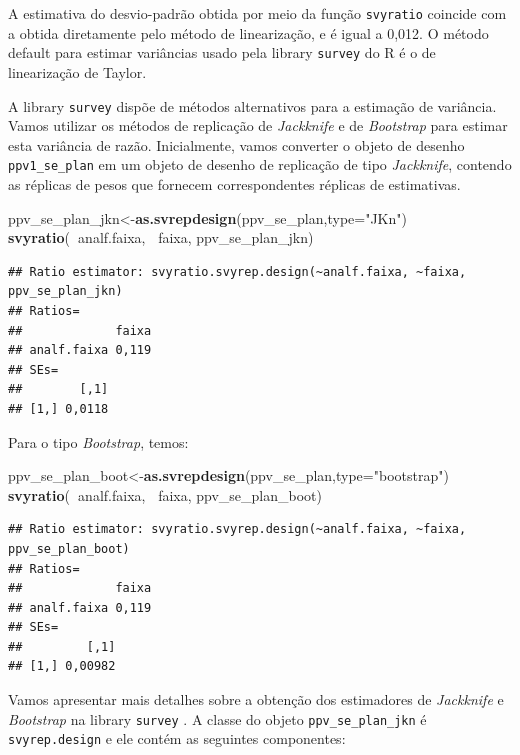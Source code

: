 \documentclass[]{book}
\newenvironment{Shaded}{\begin{snugshade}}{\end{snugshade}}
\newcommand{\KeywordTok}[1]{\textcolor[rgb]{0.13,0.29,0.53}{\textbf{#1}}}
\newcommand{\DataTypeTok}[1]{\textcolor[rgb]{0.13,0.29,0.53}{#1}}
\newcommand{\StringTok}[1]{\textcolor[rgb]{0.31,0.60,0.02}{#1}}
\newcommand{\OperatorTok}[1]{\textcolor[rgb]{0.81,0.36,0.00}{\textbf{#1}}}
\newcommand{\NormalTok}[1]{#1}
\theoremstyle{definition}
\theoremstyle{definition}
\theoremstyle{definition}
\theoremstyle{remark}
\begin{document}
A estimativa do desvio-padrão obtida por meio da função
\texttt{svyratio} coincide com a obtida diretamente pelo método de
linearização, e é igual a 0,012. O método default para estimar
variâncias usado pela library \texttt{survey} \citep{R-survey} do R é o
de linearização de Taylor.

A library \texttt{survey} dispõe de métodos alternativos para a
estimação de variância. Vamos utilizar os métodos de replicação de
\emph{Jackknife} e de \emph{Bootstrap} para estimar esta variância de
razão. Inicialmente, vamos converter o objeto de desenho
\texttt{ppv1\_se\_plan} em um objeto de desenho de replicação de tipo
\emph{Jackknife}, contendo as réplicas de pesos que fornecem
correspondentes réplicas de estimativas.

\begin{Shaded}
\begin{Highlighting}[]
\NormalTok{ppv_se_plan_jkn<-}\KeywordTok{as.svrepdesign}\NormalTok{(ppv_se_plan,}\DataTypeTok{type=}\StringTok{"JKn"}\NormalTok{)}
\KeywordTok{svyratio}\NormalTok{(}\OperatorTok{~}\NormalTok{analf.faixa, }\OperatorTok{~}\NormalTok{faixa, ppv_se_plan_jkn)}
\end{Highlighting}
\end{Shaded}

\begin{verbatim}
## Ratio estimator: svyratio.svyrep.design(~analf.faixa, ~faixa, ppv_se_plan_jkn)
## Ratios=
##             faixa
## analf.faixa 0,119
## SEs=
##        [,1]
## [1,] 0,0118
\end{verbatim}

Para o tipo \emph{Bootstrap}, temos:

\begin{Shaded}
\begin{Highlighting}[]
\NormalTok{ppv_se_plan_boot<-}\KeywordTok{as.svrepdesign}\NormalTok{(ppv_se_plan,}\DataTypeTok{type=}\StringTok{"bootstrap"}\NormalTok{)}
\KeywordTok{svyratio}\NormalTok{(}\OperatorTok{~}\NormalTok{analf.faixa, }\OperatorTok{~}\NormalTok{faixa, ppv_se_plan_boot)}
\end{Highlighting}
\end{Shaded}

\begin{verbatim}
## Ratio estimator: svyratio.svyrep.design(~analf.faixa, ~faixa, ppv_se_plan_boot)
## Ratios=
##             faixa
## analf.faixa 0,119
## SEs=
##         [,1]
## [1,] 0,00982
\end{verbatim}

Vamos apresentar mais detalhes sobre a obtenção dos estimadores de
\emph{Jackknife} e \emph{Bootstrap} na library \texttt{survey}
\citep{R-survey}. A classe do objeto \texttt{ppv\_se\_plan\_jkn} é
\texttt{svyrep.design} e ele contém as seguintes componentes:
\end{document}
